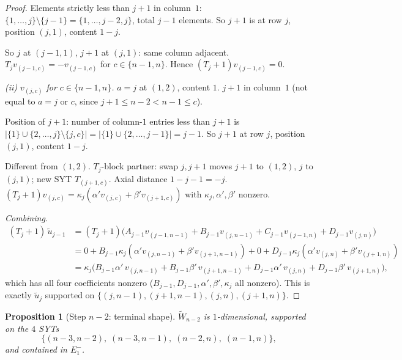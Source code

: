 \documentclass[11pt]{article}
\newtheorem{proposition}[theorem]{Proposition}
\theoremstyle{definition}
\begin{document}
\begin{proof}
Elements strictly less than $j+1$ in column~$1$: $\{1,\ldots,j\}\setminus\{j-1\}
= \{1,\ldots,j-2,j\}$, total $j-1$ elements.  So $j+1$ is at row $j$,
position $(j,1)$, content $1-j$.

So $j$ at $(j-1,1)$, $j+1$ at $(j,1)$: same column adjacent.
$T_jv_{(j-1,c)} = -v_{(j-1,c)}$ for $c \in \{n-1,n\}$.
Hence $(T_j{+}1)v_{(j-1,c)} = 0$.

\emph{(ii) $v_{(j,c)}$ for $c \in \{n-1, n\}$.} $a = j$ at $(1,2)$,
content $1$.  $j+1$ in column~$1$ (not equal to $a = j$ or $c$, since
$j+1 \le n-2 < n-1 \le c$).

Position of $j+1$: number of column-$1$ entries less than $j+1$ is
$|\{1\}\cup\{2,\ldots,j\}\setminus\{j,c\}| = |\{1\}\cup\{2,\ldots,j-1\}|
= j-1$.  So $j+1$ at row $j$, position $(j,1)$, content $1-j$.

Different from $(1,2)$.  $T_j$-block partner: swap $j,j+1$ moves
$j+1$ to $(1,2)$, $j$ to $(j,1)$; new SYT $T_{(j+1,c)}$.  Axial
distance $1-j-1 = -j$.  $(T_j{+}1)v_{(j,c)} = \kappa_j(\alpha'v_{(j,c)}
+ \beta'v_{(j+1,c)})$ with $\kappa_j, \alpha', \beta'$ nonzero.

\emph{Combining.}
\begin{align*}
   (T_j{+}1)\,\widetilde{u}_{j-1}
   &= (T_j{+}1)\bigl(A_{j-1}v_{(j-1,n-1)} + B_{j-1}v_{(j,n-1)}
      + C_{j-1}v_{(j-1,n)} + D_{j-1}v_{(j,n)}\bigr) \\
   &= 0 + B_{j-1}\kappa_j(\alpha'v_{(j,n-1)} + \beta'v_{(j+1,n-1)})
      + 0 + D_{j-1}\kappa_j(\alpha'v_{(j,n)} + \beta'v_{(j+1,n)}) \\
   &= \kappa_j\bigl(B_{j-1}\alpha'\,v_{(j,n-1)} + B_{j-1}\beta'\,v_{(j+1,n-1)}
      + D_{j-1}\alpha'\,v_{(j,n)} + D_{j-1}\beta'\,v_{(j+1,n)}\bigr),
\end{align*}
which has all four coefficients nonzero ($B_{j-1}, D_{j-1}, \alpha',
\beta',\kappa_j$ all nonzero).  This is exactly $\widetilde{u}_j$
supported on $\{(j,n-1),(j+1,n-1),(j,n),(j+1,n)\}$.
\end{proof}

\begin{proposition}[Step $n-2$: terminal shape]\label{prop:terminal}
$\widetilde{W}_{n-2}$ is $1$-dimensional, supported on the $4$ SYTs
\[
   \{(n-3,n-2),\;(n-3,n-1),\;(n-2,n),\;(n-1,n)\},
\]
and contained in $E_1^-$.
\end{proposition}
\end{document}
